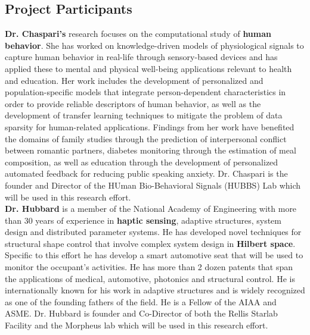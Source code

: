 \subsection{Project Participants}
\textbf{Dr. Chaspari's} research focuses on the computational study of \textbf{human behavior}. She has worked on knowledge-driven models of physiological signals to capture human behavior in real-life through sensory-based devices and has applied these to mental and physical well-being applications relevant to health and education. Her work includes the development of personalized and population-specific models that integrate person-dependent characteristics in order to provide reliable descriptors of human behavior, as well as the development of transfer learning techniques to mitigate the problem of data sparsity for human-related applications. Findings from her work have benefited the domains of family studies through the prediction of interpersonal conflict between romantic partners, diabetes monitoring through the estimation of meal composition, as well as education through the development of personalized automated feedback for reducing public speaking anxiety. Dr. Chaspari is the founder and Director of the HUman Bio-Behavioral Signals (HUBBS) Lab which will be used in this research effort.\\

\textbf{Dr. Hubbard} is a member of the National Academy of Engineering with more than 30 years of experience in \textbf{haptic sensing}, adaptive structures, system design and distributed parameter systems. He has developed novel techniques for structural shape control that involve complex system design in \textbf{Hilbert space}. Specific to this effort he has develop a smart automotive seat that will be used to monitor the occupant’s activities. He has more than 2 dozen patents that span the applications of medical, automotive, photonics and structural control. He is internationally known for his work in adaptive structures and is widely recognized as one of the founding fathers of the field. He is a Fellow of the AIAA and ASME. Dr. Hubbard is founder and Co-Director of both the Rellis Starlab Facility and the Morpheus lab which will be used in this research effort.\\

